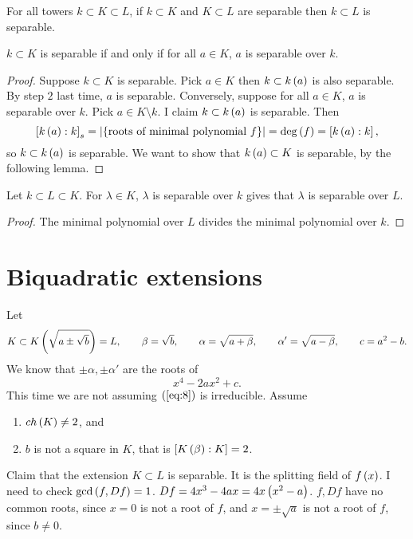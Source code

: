 \begin{corollary}
For all towers $ k \subset K \subset L $, if $ k \subset K $ and $ K \subset L $ are separable then $ k \subset L $ is separable.
\end{corollary}

\begin{corollary}
$ k \subset K $ is separable if and only if for all $ a \in K $, $ a $ is separable over $ k $.
\end{corollary}

\begin{proof}
Suppose $ k \subset K $ is separable. Pick $ a \in K $ then $ k \subset k\left( a \right) $ is also separable. By step $ 2 $ last time, $ a $ is separable. Conversely, suppose for all $ a \in K $, $ a $ is separable over $ k $. Pick $ a \in K \setminus k $. I claim $ k \subset k\left( a \right) $ is separable. Then
$$ \left[ k\left( a \right) : k \right]_s = \left\lvert \left\{ \text{roots of minimal polynomial} \ f \right\} \right\rvert = \deg\left( f \right) = \left[ k\left( a \right) : k \right], $$
so $ k \subset k\left( a \right) $ is separable. We want to show that $ k\left( a \right) \subset K $ is separable, by the following lemma.
\end{proof}

\begin{lemma}
Let $ k \subset L \subset K $. For $ \lambda \in K $, $ \lambda $ is separable over $ k $ gives that $ \lambda $ is separable over $ L $.
\end{lemma}

\begin{proof}
The minimal polynomial over $ L $ divides the minimal polynomial over $ k $.
\end{proof}

\pagebreak

\section{Biquadratic extensions}

Let
$$ K \subset K\left( \sqrt{a \pm \sqrt{b}} \right) = L, \qquad \beta = \sqrt{b}, \qquad \alpha = \sqrt{a + \beta}, \qquad \alpha' = \sqrt{a - \beta}, \qquad c = a^2 - b. $$
We know that $ \pm\alpha, \pm\alpha' $ are the roots of
\begin{equation}
\label{eq:8}
x^4 - 2ax^2 + c.
\end{equation}
This time we are not assuming $ \left( \ref{eq:8} \right) $ is irreducible. Assume
\begin{enumerate}
\item $ ch\left( K \right) \ne 2 $, and
\item $ b $ is not a square in $ K $, that is $ \left[ K\left( \beta \right) : K \right] = 2 $.
\end{enumerate}
Claim that the extension $ K \subset L $ is separable. It is the splitting field of $ f\left( x \right) $. I need to check $ \gcd\left( f, Df \right) = 1 $. $ Df = 4x^3 - 4ax = 4x\left( x^2 - a \right) $. $ f, Df $ have no common roots, since $ x = 0 $ is not a root of $ f $, and $ x = \pm\sqrt{a} $ is not a root of $ f $, since $ b \ne 0 $.

